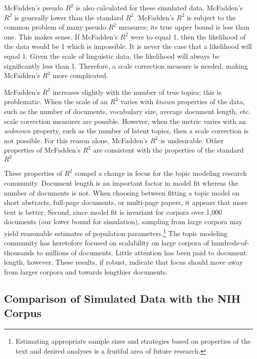 \documentclass[conference,final,]{IEEEtran}
\begin{document}
McFadden's pseudo \(R^2\) is also calculated for these simulated data.
McFadden's \(R^2\) is generally lower than the standard \(R^2\).
McFadden's \(R^2\) is subject to the common problem of many pseudo
\(R^2\) measures; its true upper bound is less than one. This makes
sense. If McFadden's \(R^2\) were to equal 1, then the likelihood of the
data would be 1 which is impossible. It is never the case that a
likelihood will equal 1. Given the scale of linguistic data, the
likelihood will always be significantly less than 1. Therefore, a scale
correction measure is needed, making McFadden's \(R^2\) more
complicated.

McFadden's \(R^2\) increases slightly with the number of true topics;
this is problematic. When the scale of an \(R^2\) varies with
\textit{known} properties of the data, such as the number of documents,
vocabulary size, average document length, etc. scale correction measures
are possible. However, when the metric varies with an \textit{unknown}
property, such as the number of latent topics, then a scale correction
is not possible. For this reason alone, McFadden's \(R^2\) is
undesirable. Other properties of McFadden's \(R^2\) are consistent with
the properties of the standard \(R^2\)

These properties of \(R^2\) compel a change in focus for the topic
modeling research community. Document length is an important factor in
model fit whereas the number of documents is not. When choosing between
fitting a topic model on short abstracts, full-page documents, or
multi-page papers, it appears that more text is better. Second, since
model fit is invariant for corpora over 1,000 documents (our lower bound
for simulation), sampling from large corpora may yield reasonable
estimates of population parameters.\footnote{Estimating appropriate
  sample sizes and strategies based on properties of the text and
  desired analyses is a fruitful area of future research.} The topic
modeling community has heretofore focused on scalability on large
corpora of hundreds-of-thousands to millions of documents. Little
attention has been paid to document length, however. These results, if
robust, indicate that focus should move away from larger corpora and
towards lengthier documents.

\hypertarget{comparison-of-simulated-data-with-the-nih-corpus}{%
\subsection{Comparison of Simulated Data with the NIH
Corpus}\label{comparison-of-simulated-data-with-the-nih-corpus}}
\end{document}
